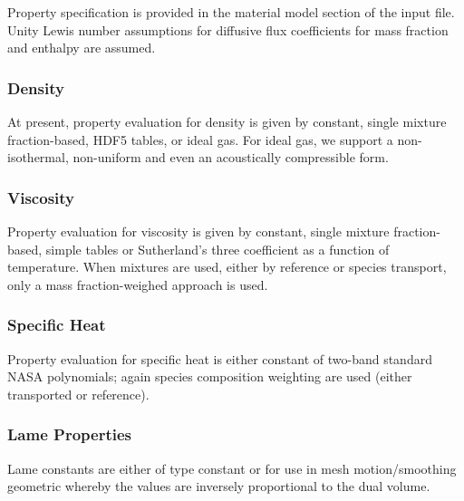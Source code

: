 Property specification is provided in the material model section of the input file. 
Unity Lewis number assumptions for diffusive flux coefficients for mass fraction and enthalpy are assumed.

\subsubsection{Density}
At present, property evaluation for density is given by constant, single mixture fraction-based, HDF5 tables, or ideal gas. For ideal gas, we support a non-isothermal, non-uniform and even an acoustically compressible form.

\subsubsection{Viscosity}
Property evaluation for viscosity is given by constant, single mixture fraction-based, simple tables
or Sutherland's three coefficient as a function of temperature. When mixtures are used, either by reference or 
species transport, only a mass fraction-weighed approach is used.

\subsubsection{Specific Heat}
Property evaluation for specific heat is either constant of two-band standard NASA polynomials; again species composition weighting are used (either transported or reference).

\subsubsection{Lame Properties}
Lame constants are either of type constant or for use in mesh motion/smoothing geometric whereby
the values are inversely proportional to the dual volume.

